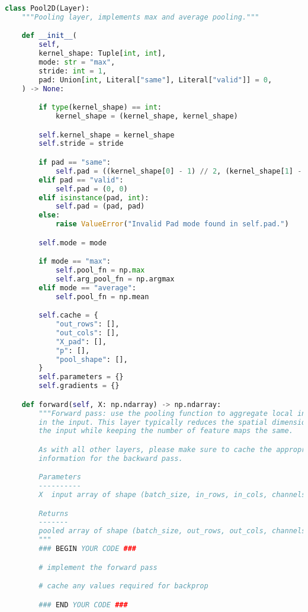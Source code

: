 \begin{lstlisting}[language=Python]
class Pool2D(Layer):
    """Pooling layer, implements max and average pooling."""

    def __init__(
        self,
        kernel_shape: Tuple[int, int],
        mode: str = "max",
        stride: int = 1,
        pad: Union[int, Literal["same"], Literal["valid"]] = 0,
    ) -> None:

        if type(kernel_shape) == int:
            kernel_shape = (kernel_shape, kernel_shape)

        self.kernel_shape = kernel_shape
        self.stride = stride

        if pad == "same":
            self.pad = ((kernel_shape[0] - 1) // 2, (kernel_shape[1] - 1) // 2)
        elif pad == "valid":
            self.pad = (0, 0)
        elif isinstance(pad, int):
            self.pad = (pad, pad)
        else:
            raise ValueError("Invalid Pad mode found in self.pad.")

        self.mode = mode

        if mode == "max":
            self.pool_fn = np.max
            self.arg_pool_fn = np.argmax
        elif mode == "average":
            self.pool_fn = np.mean

        self.cache = {
            "out_rows": [],
            "out_cols": [],
            "X_pad": [],
            "p": [],
            "pool_shape": [],
        }
        self.parameters = {}
        self.gradients = {}

    def forward(self, X: np.ndarray) -> np.ndarray:
        """Forward pass: use the pooling function to aggregate local information
        in the input. This layer typically reduces the spatial dimensionality of
        the input while keeping the number of feature maps the same.

        As with all other layers, please make sure to cache the appropriate
        information for the backward pass.

        Parameters
        ----------
        X  input array of shape (batch_size, in_rows, in_cols, channels)

        Returns
        -------
        pooled array of shape (batch_size, out_rows, out_cols, channels)
        """
        ### BEGIN YOUR CODE ###

        # implement the forward pass

        # cache any values required for backprop

        ### END YOUR CODE ###
        

\end{lstlisting}
